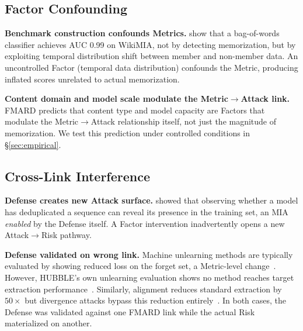 \documentclass[11pt]{article}
\begin{document}
\subsection{Factor Confounding}
\label{sec:factor-confounding}

\textbf{Benchmark construction confounds Metrics.}
\citet{meeus2025sok} show that a bag-of-words classifier achieves AUC 0.99 on
WikiMIA, not by detecting memorization, but by exploiting temporal
distribution shift between member and non-member data.
An uncontrolled Factor (temporal data distribution) confounds the Metric,
producing inflated scores unrelated to actual memorization.

\textbf{Content domain and model scale modulate the Metric$\to$Attack link.}
FMARD predicts that content type and model capacity are Factors that modulate
the Metric$\to$Attack relationship itself, not just the magnitude of
memorization.
We test this prediction under controlled conditions in \S\ref{sec:empirical}.


\subsection{Cross-Link Interference}
\label{sec:cross-link}

\textbf{Defense creates new Attack surface.}
\citet{debenedetti2024privacy} showed that observing whether a model has
deduplicated a sequence can reveal its presence in the training set, an MIA
\textit{enabled} by the Defense itself.
A Factor intervention inadvertently opens a new Attack$\to$Risk pathway.

\textbf{Defense validated on wrong link.}
Machine unlearning methods are typically evaluated by showing reduced loss on
the forget set, a Metric-level change~\citep{yao2024machine}.
However, HUBBLE's own unlearning evaluation shows no method reaches target
extraction performance~\citep{wei2025hubble}.
Similarly, alignment reduces standard extraction by $50\times$ but divergence
attacks bypass this reduction
entirely~\citep{nasr2023scalableextractiontrainingdata}.
In both cases, the Defense was validated against one FMARD link while the
actual Risk materialized on another.
\end{document}
